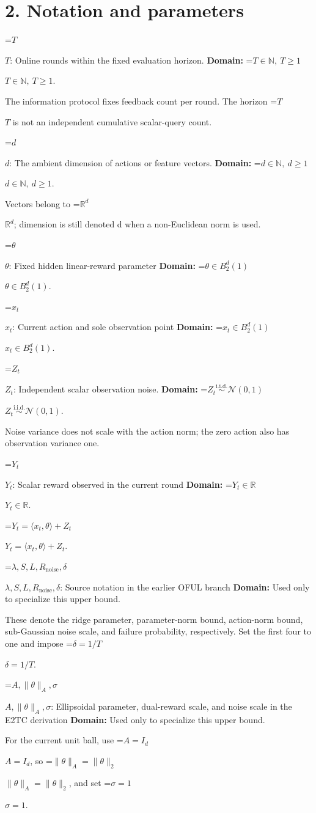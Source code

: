 \documentclass[10pt,a4paper]{article}
\newcommand{\AtlasMath}[1]{\par\begingroup\centering\setbox0=\hbox{$\displaystyle #1$}\ifdim\wd0>1.4\linewidth\typeout{ATLAS WIDE FORMULA: \the\wd0}\fi\ifdim\wd0>\linewidth\resizebox{\linewidth}{!}{\box0}\else\box0\fi\par\endgroup}
\newcommand{\AtlasInlineMath}[1]{\begingroup\setbox0=\hbox{$#1$}\ifdim\wd0>.4\linewidth\endgroup\AtlasMath{#1}\else\endgroup$#1$\fi}
\begin{document}
\section{2. Notation and parameters}
\AtlasInlineMath{T}: Online rounds within the fixed evaluation horizon. \textbf{Domain:} \AtlasInlineMath{T\in\mathbb N,\ T\ge1}.

The information protocol fixes feedback count per round. The horizon \AtlasInlineMath{T} is not an independent cumulative scalar-query count.

\AtlasInlineMath{d}: The ambient dimension of actions or feature vectors. \textbf{Domain:} \AtlasInlineMath{d\in\mathbb N,\ d\ge1}.

Vectors belong to \AtlasInlineMath{\mathbb R^d}; dimension is still denoted d when a non-Euclidean norm is used.

\AtlasInlineMath{\theta}: Fixed hidden linear-reward parameter \textbf{Domain:} \AtlasInlineMath{\theta\in B_2^d(1)}.

\AtlasInlineMath{x_t}: Current action and sole observation point \textbf{Domain:} \AtlasInlineMath{x_t\in B_2^d(1)}.

\AtlasInlineMath{Z_t}: Independent scalar observation noise. \textbf{Domain:} \AtlasInlineMath{Z_t\overset{\mathrm{i.i.d.}}\sim\mathcal N(0,1)}.

Noise variance does not scale with the action norm; the zero action also has observation variance one.

\AtlasInlineMath{Y_t}: Scalar reward observed in the current round \textbf{Domain:} \AtlasInlineMath{Y_t\in\mathbb R}.

\AtlasInlineMath{Y_t=\langle x_t,\theta\rangle+Z_t}.

\AtlasInlineMath{\lambda,S,L,R_{\mathrm{noise}},\delta}: Source notation in the earlier OFUL branch \textbf{Domain:} Used only to specialize this upper bound.

These denote the ridge parameter, parameter-norm bound, action-norm bound, sub-Gaussian noise scale, and failure probability, respectively. Set the first four to one and impose \AtlasInlineMath{\delta=1/T}.

\AtlasInlineMath{A,\|\theta\|_A,\sigma}: Ellipsoidal parameter, dual-reward scale, and noise scale in the E2TC derivation \textbf{Domain:} Used only to specialize this upper bound.

For the current unit ball, use \AtlasInlineMath{A=I_d}, so \AtlasInlineMath{\|\theta\|_A=\|\theta\|_2}, and set \AtlasInlineMath{\sigma=1}.
\end{document}
